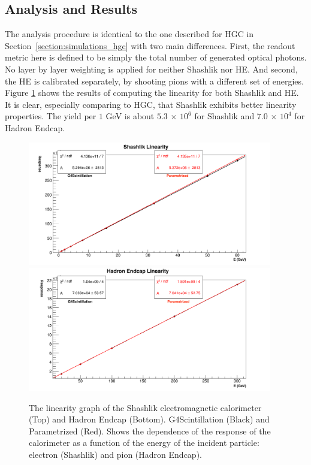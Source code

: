 \subsection{Analysis and Results}
The analysis procedure is identical to the one described for HGC in Section~\ref{section:simulations_hgc} with two main differences. First, the readout metric here is defined to be simply the total number of generated optical photons. No layer by layer weighting is applied for neither Shashlik nor HE. And second, the HE is calibrated separately, by shooting pions with a different set of energies. Figure \ref{fig:simulations_shashlik_linearity} shows the results of computing the linearity for both Shashlik and HE. It is clear, especially comparing to {\sc HGC}, that Shashlik exhibits better linearity properties. The yield per $1$ GeV is about $5.3$ $\times$ $10^6$ for Shashlik and $7.0$ $\times$ $10^4$ for Hadron Endcap.
 \begin{figure}[htbp]
    \centering
    \includegraphics[width=0.95\textwidth]{figures/ch_simulations/shashlik/performance/ResponseVsEnergy.png}\\
    \includegraphics[width=0.95\textwidth]{figures/ch_simulations/he/performance/Linearity.png}
    \caption{The linearity graph of the Shashlik electromagnetic calorimeter (Top) and Hadron Endcap (Bottom). G4Scintillation (Black) and Parametrized (Red). Shows the dependence of the response of the calorimeter as a function of the energy of the incident particle: electron (Shashlik) and pion (Hadron Endcap).}
    \label{fig:simulations_shashlik_linearity}
 \end{figure}

